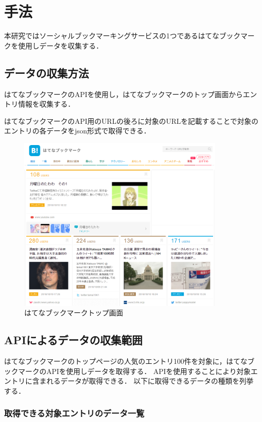 \chapter{手法}
本研究ではソーシャルブックマーキングサービスの1つであるはてなブックマークを使用しデータを収集する．

\section{データの収集方法}
はてなブックマークのAPI\cite{hatena-develop}を使用し，はてなブックマークのトップ画面からエントリ情報を収集する．\par
はてなブックマークのAPI用のURLの後ろに対象のURLを記載することで対象のエントリの各データをjson形式で取得できる．

\begin{figure}[htb]
\centering
\includegraphics[width=10cm]{hatena-ta.png}
\caption{はてなブックマークトップ画面}\label{hatenatop}
\end{figure}

\newpage

\section{APIによるデータの収集範囲}
はてなブックマークのトップページの人気のエントリ100件を対象に，はてなブックマークのAPI\cite{hatena-api}を使用しデータを取得する．
APIを使用することにより対象エントリに含まれるデータが取得できる．
以下に取得できるデータの種類を列挙する．\par

\subsection{取得できる対象エントリのデータ一覧}

